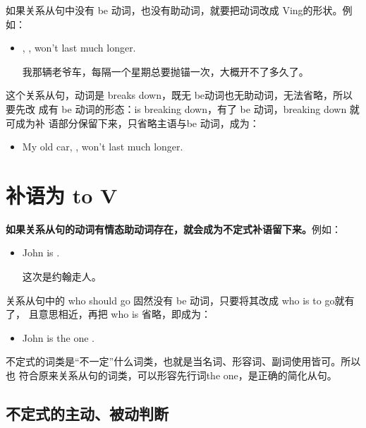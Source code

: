 如果关系从句中没有 be 动词，也没有助动词，就要把动词改成 Ving的形状。例如：
\begin{itemize}
\item {}, , won't last much longer.

  我那辆老爷车，每隔一个星期总要抛锚一次，大概开不了多久了。
\end{itemize}
这个关系从句，动词是 breaks down，既无 be动词也无助动词，无法省略，所以要先改
成有 be 动词的形态：is breaking down，有了 be 动词，breaking down 就可成为补
语部分保留下来，只省略主语与be 动词，成为：
\begin{itemize}
\item My old car, , won't last much longer.
\end{itemize}

\section{补语为 to V}

\textbf{如果关系从句的动词有情态助动词存在，就会成为不定式补语留下来。}例如：
\begin{itemize}
\item John is  .

  这次是约翰走人。
\end{itemize}
关系从句中的 who should go 固然没有 be 动词，只要将其改成 who is to go就有了，
且意思相近，再把 who is 省略，即成为：
\begin{itemize}
\item   John is the one .
\end{itemize}

不定式的词类是“不一定”什么词类，也就是当名词、形容词、副词使用皆可。所以也
符合原来关系从句的词类，可以形容先行词the one，是正确的简化从句。

\subsection{不定式的主动、被动判断}

